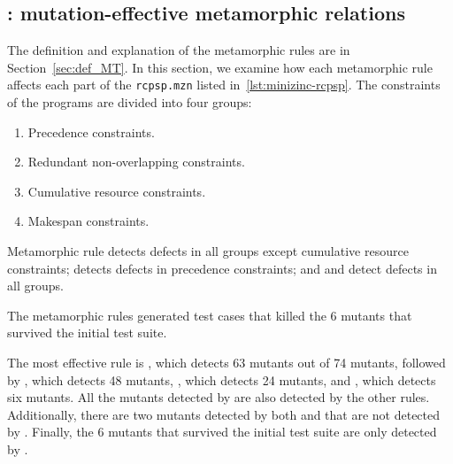 \subsection{\rqidentifying: mutation-effective metamorphic relations}

The definition and explanation of the metamorphic rules are in
Section~\ref{sec:def_MT}. In this section, we examine how each
metamorphic rule affects each part of the \lstinline|rcpsp.mzn| listed
in~\ref{lst:minizinc-rcpsp}. The constraints of the programs are
divided into four groups:

\begin{enumerate}
\item\label{item:precdence} Precedence constraints.
\item\label{item:redundant} Redundant non-overlapping constraints.
\item\label{item:cumulative} Cumulative resource constraints.
\item\label{item:makespan} Makespan constraints.
\end{enumerate}

Metamorphic rule  detects defects in all groups except
cumulative resource constraints;  detects defects in precedence
constraints; and  and  detect defects in all groups.

The metamorphic rules generated test cases that killed the 6 mutants that survived the initial test suite.


The most effective rule is ,
which detects 63 mutants out of 74 mutants,
followed by , which detects 48
mutants, , which detects 24 mutants, and , which detects
six mutants. All the mutants detected by  are also detected by
the other rules. Additionally, there are two mutants detected by both 
and  that are not detected by .
Finally, the 6 mutants that survived the initial test suite are only
detected by .



